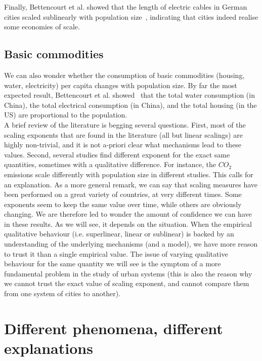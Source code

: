 Finally, Bettencourt et al. showed that the length of electric cables in German cities
scaled sublinearly with population size~\cite{Bettencourt:2007}, indicating that
cities indeed realise some economies of scale.

\subsection{Basic commodities}
\label{sub:basic_commodities}

We can also wonder whether the consumption of basic commodities (housing, water,
electricity) per capita changes with population size. By far the most expected
result, Bettencourt et al. showed~\cite{Bettencourt:2007} that the total water
consumption (in China), the total electrical
consumption (in China),  and the total housing (in the US) are proportional to
the population.\\


A brief review of the literature is begging several questions. First, most of
the scaling exponents that are found in the literature (all but linear scalings)
are highly non-trivial, and it is not a-priori clear what mechanisms lead to
these values. Second, several studies find different exponent for the exact same
quantities, sometimes with a qualitative difference. For instance, the $CO_2$
emissions scale differently with population size in different studies. This
calls for an explanation.  As a more general remark, we can say that scaling
measures have been performed on a great variety of countries, at very different
times. Some exponents seem to keep the same value over time, while others are
obviously changing. We are therefore led to wonder the amount of confidence we
can have in these results.  As we will see, it depends on the situation. When
the empirical qualitative behaviour (i.e. superlinear, linear or sublinear) is
backed by an understanding of the underlying mechanisms (and a model), we have
more reason to trust it than a single empirical value. The issue of varying
qualitative behaviour for the same quantity we will see is the symptom of a
more fundamental problem in the study of urban systems (this is also the reason
why we cannot trust the exact value of scaling exponent, and cannot compare them
from one system of cities to another).

\section{Different phenomena, different explanations}
\label{sec:different_phenomena_different_explanations}

